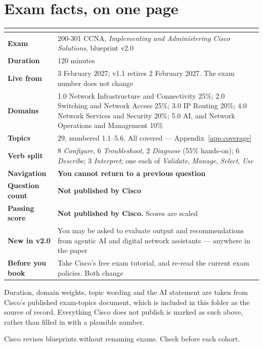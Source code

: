 \section{Exam facts, on one page}

\begin{longtable}{@{}L{4.2cm}L{11.2cm}@{}}
\toprule
{}
\textbf{} & \textbf{} \\
\midrule
\endhead
\textbf{Exam} & 200-301 CCNA, \emph{Implementing and Administering Cisco
Solutions}, blueprint v2.0 \\
\textbf{Duration} & 120 minutes \\
\textbf{Live from} & 3 February 2027; v1.1 retires 2 February 2027. The exam
number does not change \\
\textbf{Domains} & 1.0 Network Infrastructure and Connectivity 25\%; 2.0
Switching and Network Access 25\%; 3.0 IP Routing 20\%; 4.0 Network Services and
Security 20\%; 5.0 AI, and Network Operations and Management 10\% \\
\textbf{Topics} & 29, numbered 1.1--5.6. All covered ---
Appendix~\ref{app:coverage} \\
\textbf{Verb split} & 8 \emph{Configure}, 6 \emph{Troubleshoot}, 2
\emph{Diagnose} (55\% hands-on); 6 \emph{Describe}; 3 \emph{Interpret}; one each
of \emph{Validate}, \emph{Manage}, \emph{Select}, \emph{Use} \\
\textbf{Navigation} & \textbf{You cannot return to a previous question} \\
\textbf{Question count} & \textbf{Not published by Cisco} \\
\textbf{Passing score} & \textbf{Not published by Cisco.} Scores are scaled \\
\textbf{New in v2.0} & You may be asked to evaluate output and recommendations
from agentic AI and digital network assistants --- anywhere in the paper \\
\textbf{Before you book} & Take Cisco's free exam tutorial, and re-read the
current exam policies. Both change \\
\bottomrule
\end{longtable}

\begin{alertbox}
Duration, domain weights, topic wording and the AI statement are taken from
Cisco's published exam-topics document, which is included in this folder as the
source of record. Everything Cisco does not publish is marked as such above,
rather than filled in with a plausible number.

Cisco revises blueprints without renaming exams. Check
 before each cohort.
\end{alertbox}
